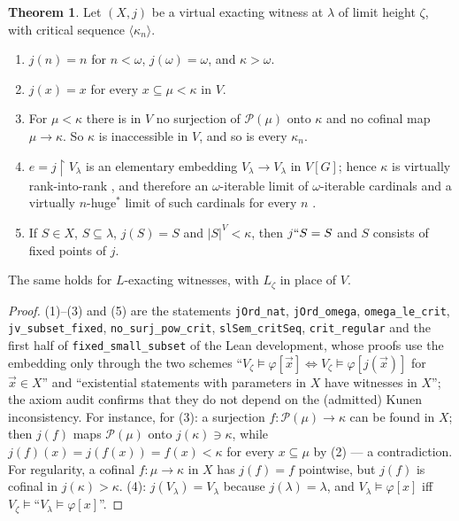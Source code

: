 \documentclass[11pt,letterpaper]{article}
\theoremstyle{definition}
\newtheorem{theorem}[definition]{Theorem}
\numberwithin{equation}{section}
\newcommand{\Pow}{\mathcal P}
\newcommand{\restr}{\mathbin{\upharpoonright}}
\begin{document}
\begin{theorem}\label{thm:free}
Let $(X,j)$ be a virtual exacting witness at $\lambda$ of limit height $\zeta$, with critical sequence $\langle\kappa_n\rangle$.
\begin{enumerate}
\item $j(n)=n$ for $n<\omega$, $j(\omega)=\omega$, and $\kappa>\omega$.
\item $j(x)=x$ for every $x\subseteq\mu<\kappa$ in $V$.
\item For $\mu<\kappa$ there is in $V$ no surjection of $\Pow(\mu)$ onto $\kappa$ and no cofinal map $\mu\to\kappa$. So $\kappa$ is inaccessible in $V$, and so is every $\kappa_n$.
\item $e=j\restr V_\lambda$ is an elementary embedding $V_\lambda\to V_\lambda$ in $V[G]$; hence $\kappa$ is virtually rank-into-rank \cite[Def.~2.4]{gs}, and therefore an $\omega$-iterable limit of $\omega$-iterable cardinals and a virtually $n$-huge$^*$ limit of such cardinals for every $n$ \cite[Thm.~4.15, 4.20]{gs}.
\item If $S\in X$, $S\subseteq\lambda$, $j(S)=S$ and $|S|^V<\kappa$, then $j``S=S$ and $S$ consists of fixed points of $j$.
\end{enumerate}
The same holds for $L$-exacting witnesses, with $L_\zeta$ in place of $V$.
\end{theorem}

\begin{proof}
(1)--(3) and (5) are the statements \nolinkurl{jOrd_nat}, \nolinkurl{jOrd_omega}, \nolinkurl{omega_le_crit}, \nolinkurl{jv_subset_fixed}, \nolinkurl{no_surj_pow_crit}, \nolinkurl{slSem_critSeq}, \nolinkurl{crit_regular} and the first half of \nolinkurl{fixed_small_subset} of the Lean development, whose proofs use the embedding only through the two schemes ``$V_\zeta\models\varphi[\vec x]\iff V_\zeta\models\varphi[j(\vec x)]$ for $\vec x\in X$'' and ``existential statements with parameters in $X$ have witnesses in $X$''; the axiom audit confirms that they do not depend on the (admitted) Kunen inconsistency. For instance, for (3): a surjection $f:\Pow(\mu)\to\kappa$ can be found in $X$; then $j(f)$ maps $\Pow(\mu)$ onto $j(\kappa)\ni\kappa$, while $j(f)(x)=j(f(x))=f(x)<\kappa$ for every $x\subseteq\mu$ by (2) --- a contradiction. For regularity, a cofinal $f:\mu\to\kappa$ in $X$ has $j(f)=f$ pointwise, but $j(f)$ is cofinal in $j(\kappa)>\kappa$. (4): $j(V_\lambda)=V_\lambda$ because $j(\lambda)=\lambda$, and $V_\lambda\models\varphi[x]$ iff $V_\zeta\models$``$V_\lambda\models\varphi[x]$''.
\end{proof}
\end{document}
